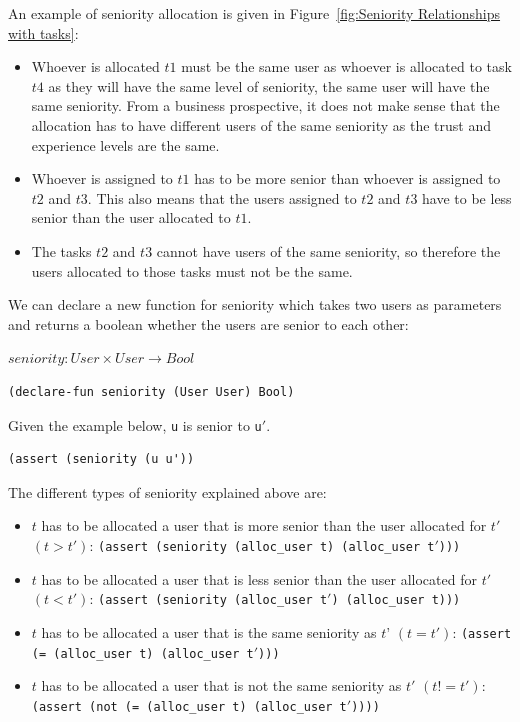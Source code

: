 \documentclass[a4paper]{report}
\begin{document}
An example of seniority allocation is given in Figure~\ref{fig:Seniority Relationships with tasks}:
\begin{itemize}
\item Whoever is allocated $t1$ must be the same user as whoever is allocated to task $t4$ as they will have the same level of seniority, the same user will have the same seniority. From a business prospective, it does not make sense that the allocation has to have different users of the same seniority as the trust and experience levels are the same. 
\item Whoever is assigned to $t1$ has to be more senior than whoever is assigned to $t2$ and $t3$. This also means that the users assigned to $t2$ and $t3$ have to be less senior than the user allocated to $t1$.
\item The tasks $t2$ and $t3$ cannot have users of the same seniority, so therefore the users allocated to those tasks must not be the same.
\end{itemize}

We can declare a new function for seniority which takes two users as parameters and returns a boolean whether the users are senior to each other:
\begin{center}
$seniority : User \times User \rightarrow Bool$
\end{center}
\begin{lstlisting}[frame=single]
(declare-fun seniority (User User) Bool)
\end{lstlisting}

Given the example below, \texttt{u} is senior to \texttt{u\ensuremath{'}}.
\begin{lstlisting}[frame=single]
(assert (seniority (u u'))
\end{lstlisting}

The different types of seniority explained above are:
\begin{itemize}
\item $t$ has to be allocated a user that is more senior than the user allocated for $t\ensuremath{'}$ $(t > t\ensuremath{'})$: \texttt{(assert (seniority (alloc\_user t) (alloc\_user t\ensuremath{'})))}
\item $t$ has to be allocated a user that is less senior than the user allocated for $t\ensuremath{'}$ $(t < t\ensuremath{'})$: \texttt{(assert (seniority (alloc\_user t\ensuremath{'}) (alloc\_user t)))}
\item $t$ has to be allocated a user that is the same seniority as $t’$ $(t = t\ensuremath{'})$: \texttt{(assert (= (alloc\_user t) (alloc\_user t\ensuremath{'})))}
\item $t$ has to be allocated a user that is not the same seniority as $t\ensuremath{'}$ $(t != t\ensuremath{'})$: \texttt{(assert (not (= (alloc\_user t) (alloc\_user t\ensuremath{'}))))}
\end{itemize}
\end{document}
